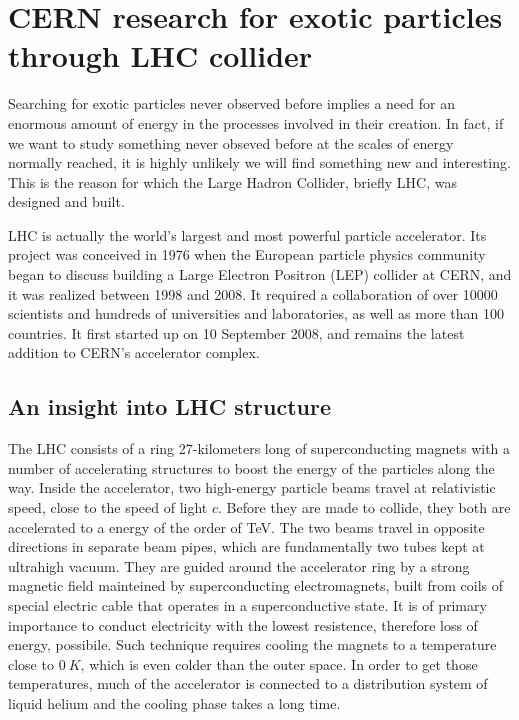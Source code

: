\chapter{CERN research for exotic particles through LHC collider}
\label{chap:LHC}





Searching for exotic particles never observed before implies a need for an enormous amount of energy in the processes involved in their creation. In fact, if we want to study something never obseved before at the scales of energy normally reached, it is highly unlikely we will find something new and interesting. This is the reason for which the Large Hadron Collider, briefly LHC, was designed and built.

LHC is actually the world's largest and most powerful particle accelerator. Its project was conceived in 1976 when the European particle physics community began to discuss building a Large Electron Positron (LEP) collider at CERN, and it was realized between 1998 and 2008. It required a collaboration of over 10000 scientists and hundreds of universities and laboratories, as well as more than 100 countries. It first started up on 10 September 2008, and remains the latest addition to CERN’s accelerator complex.






\section{An insight into LHC structure}
The LHC consists of a ring 27-kilometers long of superconducting magnets with a number of accelerating structures to boost the energy of the particles along the way. Inside the accelerator, two high-energy particle beams travel at relativistic speed, close to the speed of light $c$. Before they are made to collide, they both are accelerated to a energy of the order of TeV. The two beams travel in opposite directions in separate beam pipes, which are fundamentally two tubes kept at ultrahigh vacuum. They are guided around the accelerator ring by a strong magnetic field mainteined by superconducting electromagnets, built from coils of special electric cable that operates in a superconductive state. It is of primary importance to conduct electricity with the lowest resistence, therefore loss of energy, possibile. Such technique requires cooling the magnets to a temperature close to $0~\si{K}$, which is even colder than the outer space. In order to get those temperatures, much of the accelerator is connected to a distribution system of liquid helium and the cooling phase takes a long time.

